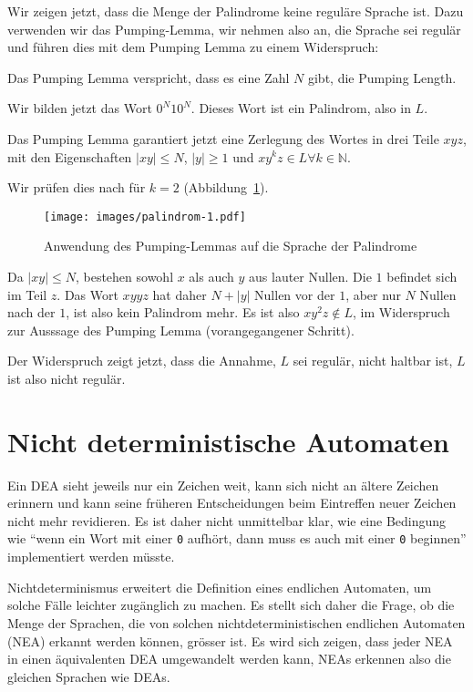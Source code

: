 Wir zeigen jetzt, dass die Menge der Palindrome keine reguläre Sprache ist.
Dazu verwenden wir das Pumping-Lemma, wir nehmen also an, die Sprache
sei regulär und führen dies mit dem Pumping Lemma zu einem Widerspruch:
\begin{compactenum}
\item Das Pumping Lemma verspricht, dass es eine Zahl $N$ gibt, die
Pumping Length.
\item Wir bilden jetzt das Wort $0^N10^N$.
Dieses Wort ist ein Palindrom,
also in $L$.
\item Das Pumping Lemma garantiert jetzt eine Zerlegung des Wortes
in drei Teile $xyz$, mit den Eigenschaften $|xy|\le N$, $|y|\ge 1$ und
$xy^kz\in L\forall k\in\mathbb N$.
\item Wir prüfen dies nach für $k=2$ (Abbildung~\ref{regular:pl-palindrome}).
\begin{figure}
\centering
\texttt{[image: images/palindrom-1.pdf]}
\caption{Anwendung des Pumping-Lemmas auf die Sprache der Palindrome
\label{regular:pl-palindrome}}
\end{figure}
Da $|xy|\le N$, bestehen sowohl $x$ als auch $y$ aus lauter Nullen.
Die $1$ befindet sich im Teil $z$.
Das Wort $xyyz$ hat daher $N+|y|$ Nullen vor der $1$, aber nur $N$ Nullen
nach der $1$, ist also kein Palindrom mehr.
Es ist also $xy^2z\not\in L$,
im Widerspruch zur Ausssage des Pumping Lemma (vorangegangener Schritt).
\end{compactenum}
Der Widerspruch zeigt jetzt, dass die Annahme, $L$ sei regulär, nicht
haltbar ist, $L$ ist also nicht regulär.

\section{Nicht deterministische Automaten\label{regulaer:nea}}
Ein DEA sieht jeweils nur ein Zeichen weit, kann sich nicht an ältere
Zeichen erinnern und kann seine früheren Entscheidungen beim Eintreffen
neuer Zeichen nicht mehr revidieren.
Es ist daher nicht unmittelbar klar,
wie eine Bedingung wie ``wenn ein
Wort mit einer {\tt 0} aufhört, dann muss es auch mit einer {\tt 0}
beginnen'' implementiert werden müsste.

%
%
Nichtdeterminismus erweitert 
die Definition eines endlichen Automaten, um solche Fälle leichter 
zugänglich zu machen.
Es stellt sich daher die Frage, ob die Menge 
der Sprachen, die von solchen nichtdeterministischen endlichen Automaten (NEA)
erkannt werden können,
grösser ist.
Es wird sich zeigen, dass jeder NEA
in einen äquivalenten DEA umgewandelt werden kann, NEAs erkennen also
die gleichen Sprachen wie DEAs.

